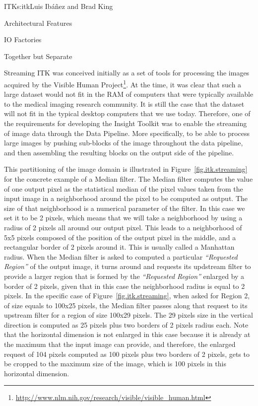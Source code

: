 \begin{aosachapter}{ITK}{s:itk}{Luis Ib\'{a}\~{n}ez and Brad King}
\begin{aosasect1}{Architectural Features}
\begin{aosasect2}{IO Factories}
\begin{aosasect3}{Together but Separate}
\end{aosasect3}

\end{aosasect2}

\begin{aosasect2}{Streaming}\label{sec.itk.streaming}
ITK was conceived initially as a set of tools for processing the images
acquired by the Visible Human
Project\footnote{\url{http://www.nlm.nih.gov/research/visible/visible_human.html}}.
At the time, it was clear that such a large dataset would not fit in the RAM of
computers that were typically available to the medical imaging research
community. It is still the case that the dataset will not fit in the typical
desktop computers that we use today. Therefore, one of the requirements for
developing the Insight Toolkit was to enable the streaming of image data
through the Data Pipeline. More specifically, to be able to process large
images by pushing sub-blocks of the image throughout the data pipeline, and then
assembling the resulting blocks on the output side of the pipeline.


This partitioning of the image domain is illustrated in
Figure~\ref{fig.itk.streaming} for the concrete example of a Median filter. The
Median filter computes the value of one output pixel as the statistical median
of the pixel values taken from the input image in a neighborhood around the
pixel to be computed as output. The size of that neighborhood is a numerical
parameter of the filter. In this case we set it to be 2 pixels, which means
that we will take a neighborhood by using a radius of 2 pixels all around our
output pixel. This leads to a neighborhood of 5x5 pixels composed of the
position of the output pixel in the middle, and a rectangular border of 2
pixels around it. This is usually called a Manhattan radius. When the Median
filter is asked to computed a particular \emph{``Requested Region''} of the
output image, it turns around and requests its updstream filter to provide a
larger region that is formed by the \emph{``Requested Region''} enlarged by a
border of 2 pixels, given that in this case the neighborhood radius is equal to
2 pixels. In the specific case of Figure~\ref{fig.itk.streaming}, when asked
for Region 2, of size equals to 100x25 pixels, the Median filter passes along
that request to its upstream filter for a region of size 100x29 pixels. The 29
pixels size in the vertical direction is computed as 25 pixels plus two borders
of 2 pixels radius each. Note that the horizontal dimension is not enlarged in
this case because it is already at the maximum that the input image can
provide, and therefore, the enlarged request of 104 pixels computed as 100
pixels plus two borders of 2 pixels, gets to be cropped to the maximum size of
the image, which is 100 pixels in this horizontal dimension.


\end{aosasect2}
\end{aosasect1}
\end{aosachapter}
